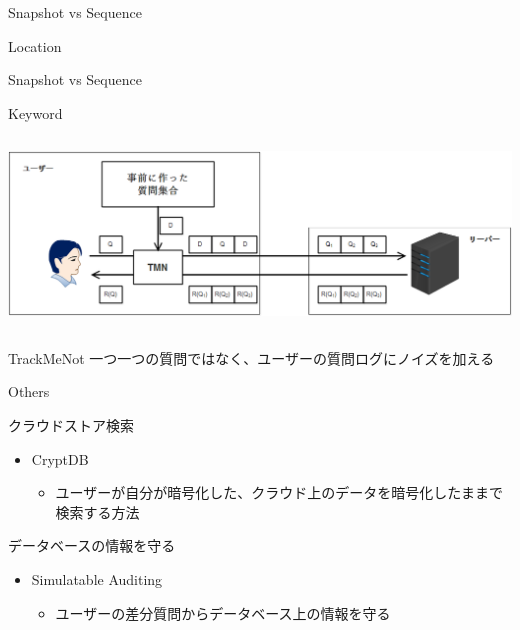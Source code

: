 \documentclass[14pt,xcolor=dvipsnames,table,dvipdfmx]{beamer}
\begin{document}
\begin{frame}{Snapshot vs Sequence}
	\begin{block}{Location}
	\end{block}
\end{frame}

\begin{frame}{Snapshot vs Sequence}
	\begin{block}{Keyword}
	    \begin{columns}[t]
			\begin{column}{1.0\textwidth} %
				\includegraphics[width=\columnwidth]{photo5.png}
			\end{column}
		\end{columns}
		\begin{block}{TrackMeNot \cite{howe_trackmenot:_2009}}
			一つ一つの質問ではなく、ユーザーの質問ログにノイズを加える
		\end{block}
	\end{block}
\end{frame}

\begin{frame}{Others}
	\begin{exampleblock}{クラウドストア検索}
		\begin{itemize}
			\item CryptDB \cite{popa_cryptdb:_2011}
			\begin{itemize}
				\item ユーザーが自分が暗号化した、クラウド上のデータを暗号化したままで検索する方法
			\end{itemize}
		\end{itemize}
	\end{exampleblock}
   \begin{exampleblock}{データベースの情報を守る}
		\begin{itemize}
			\item Simulatable Auditing \cite{kenthapadi_simulatable_2005}
			\begin{itemize}
				\item ユーザーの差分質問からデータベース上の情報を守る
			\end{itemize}
		\end{itemize}
    \end{exampleblock}

\end{frame}
\end{document}
